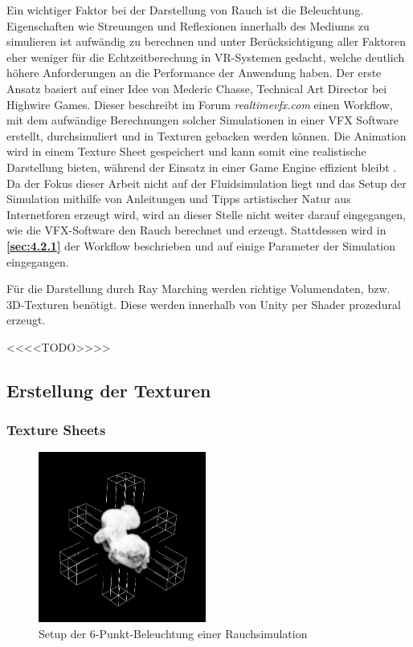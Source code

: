 Ein wichtiger Faktor bei der Darstellung von Rauch ist die Beleuchtung. Eigenschaften wie Streuungen und Reflexionen innerhalb des Mediums zu simulieren ist
aufwändig zu berechnen und unter Berücksichtigung aller Faktoren eher weniger für die Echtzeitberechung in VR-Systemen gedacht, welche deutlich höhere Anforderungen an die Performance der Anwendung
haben. Der erste Ansatz basiert auf einer Idee von Mederic Chasse, Technical Art Director  bei Highwire Games.
Dieser beschreibt im Forum \textit{realtimevfx.com} einen Workflow, mit dem aufwändige Berechnungen solcher Simulationen in einer VFX Software erstellt, durchsimuliert und in Texturen gebacken
werden können.
Die Animation wird in einem Texture Sheet gespeichert und kann somit eine realistische Darstellung bieten, während der Einsatz in einer Game Engine effizient bleibt \parencite{Chasse2018}.
Da der Fokus dieser Arbeit nicht auf der Fluidsimulation liegt und das Setup der Simulation mithilfe von Anleitungen
und Tipps artistischer Natur aus Internetforen erzeugt wird, wird an dieser Stelle nicht weiter darauf eingegangen, wie die VFX-Software den Rauch berechnet und erzeugt.
Stattdessen wird in \textbf{\autoref{sec:4.2.1}} der Workflow beschrieben und auf einige Parameter der Simulation eingegangen.

Für die Darstellung durch Ray Marching werden richtige Volumendaten, bzw. 3D-Texturen benötigt. Diese werden innerhalb von Unity
per Shader prozedural erzeugt.

<<<<TODO>>>>


\subsection{Erstellung der Texturen}
\label{sec:4.2}


\subsubsection{Texture Sheets}
\label{sec:4.2.1}
\begin{figure}[h!]
	\includegraphics[width=0.49\textwidth]{Grafiken/Implementation/Lightmaps/Smoke_LightSetup.png}
	\centering
	\begin{footnotesize}
		\caption{Setup der 6-Punkt-Beleuchtung einer Rauchsimulation}
		\label{fig:lightSetup}
	\end{footnotesize}
\end{figure}

